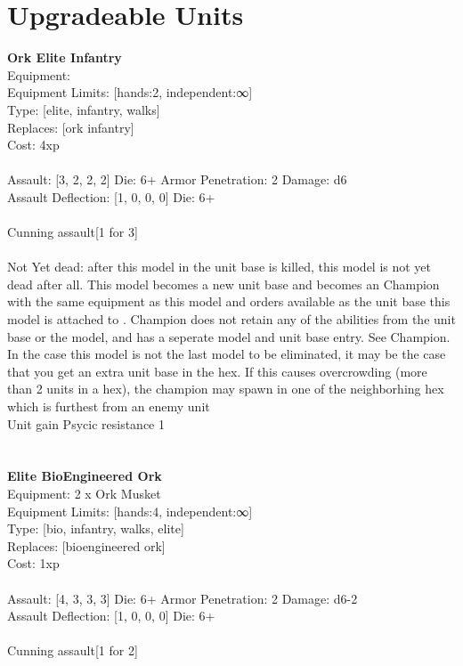 \pagebreak\section{Upgradeable Units}{\bf Ork Elite Infantry } \\
Equipment:  \\
Equipment Limits: [hands:2, independent:∞] \\
Type: [elite, infantry, walks] \\
Replaces: [ork infantry] \\
Cost: 4xp\\
\ \\
Assault: [3, 2, 2, 2] Die: 6+ Armor Penetration: 2 Damage: d6 \\
Assault Deflection: [1, 0, 0, 0] Die: 6+\\
\\ 
Cunning assault[1 for 3]\\ 
 
\ \\
Not Yet dead: after this model in the unit base is killed, this model is not yet dead after all. This model becomes a new unit base and becomes an Champion with the same equipment as this model and orders available as the unit base this model is attached to . Champion does not retain any of the abilities from the unit base or the model, and has a seperate model and unit base entry. See Champion. In the case this model is not the last model to be eliminated, it may be the case that you get an extra unit base in the hex. If this causes overcrowding (more than 2 units in a hex), the champion may spawn in one of the neighborhing hex which is furthest from an enemy unit\\ 
Unit gain Psycic resistance 1\\ 

\ \\
 
\ \\

{\bf Elite BioEngineered Ork } \\
Equipment: 2 x Ork Musket \\
Equipment Limits: [hands:4, independent:∞] \\
Type: [bio, infantry, walks, elite] \\
Replaces: [bioengineered ork] \\
Cost: 1xp\\
\ \\
Assault: [4, 3, 3, 3] Die: 6+ Armor Penetration: 2 Damage: d6-2 \\
Assault Deflection: [1, 0, 0, 0] Die: 6+\\
\\ 
Cunning assault[1 for 2]\\ 
 

